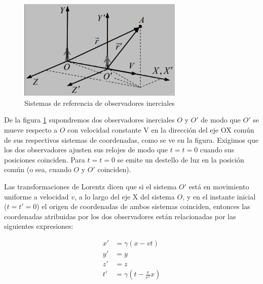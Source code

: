 \documentclass[12pt,twoside]{rif}
\begin{document}
\begin{figure}[h!]
	\centering
	\includegraphics[width=0.7\textwidth]{img/LORENTZ.PNG}
	\caption{Sistemas de referencia de observadores inerciales }
	\label{fig:02}
	\end{figure}
	


De la figura \ref*{fig:02}	supondremos dos observadores inerciales $O$ y $O'$ de modo que $O'$ se mueve respecto a $O$ con velocidad constante V en la dirección del eje OX común de sus respectivos sistemas de coordenadas, como se ve en la figura. Exigimos 
que los dos observadores ajusten sus relojes de modo que $t = t = 0$ cuando sus posiciones coinciden.
Para $t = t = 0$ se emite un destello de luz en la
posición común (o sea, cuando $O$ y $O'$ coinciden). 

Las transformaciones de Lorentz dicen que si el sistema $O'$
está en movimiento uniforme a velocidad  $v$, a lo largo del eje X del sistema $O$, y 
en el instante inicial ($t=t'=0$) el origen 
de coordenadas de ambos sistemas coinciden, entonces las coordenadas atribuidas por los 
dos observadores están relacionadas por las siguientes expresiones:
	
\begin{align*}
	x'&=\gamma(x-vt)\\
	y'&=y\\
	z'&=z\\
	t'&=\gamma(t-\frac{v}{c^{2}}x)\\
\end{align*}
\end{document}
